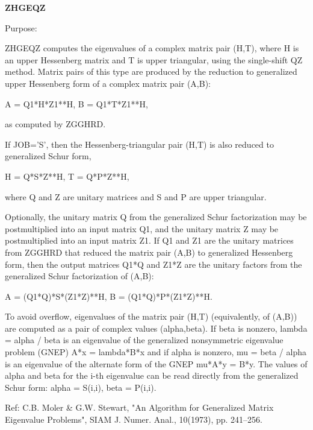 {\bfseries Z\+H\+G\+E\+Q\+Z} 

 \begin{DoxyParagraph}{Purpose\+: }
\begin{DoxyVerb} ZHGEQZ computes the eigenvalues of a complex matrix pair (H,T),
 where H is an upper Hessenberg matrix and T is upper triangular,
 using the single-shift QZ method.
 Matrix pairs of this type are produced by the reduction to
 generalized upper Hessenberg form of a complex matrix pair (A,B):
 
    A = Q1*H*Z1**H,  B = Q1*T*Z1**H,
 
 as computed by ZGGHRD.
 
 If JOB='S', then the Hessenberg-triangular pair (H,T) is
 also reduced to generalized Schur form,
 
    H = Q*S*Z**H,  T = Q*P*Z**H,
 
 where Q and Z are unitary matrices and S and P are upper triangular.
 
 Optionally, the unitary matrix Q from the generalized Schur
 factorization may be postmultiplied into an input matrix Q1, and the
 unitary matrix Z may be postmultiplied into an input matrix Z1.
 If Q1 and Z1 are the unitary matrices from ZGGHRD that reduced
 the matrix pair (A,B) to generalized Hessenberg form, then the output
 matrices Q1*Q and Z1*Z are the unitary factors from the generalized
 Schur factorization of (A,B):
 
    A = (Q1*Q)*S*(Z1*Z)**H,  B = (Q1*Q)*P*(Z1*Z)**H.
 
 To avoid overflow, eigenvalues of the matrix pair (H,T)
 (equivalently, of (A,B)) are computed as a pair of complex values
 (alpha,beta).  If beta is nonzero, lambda = alpha / beta is an
 eigenvalue of the generalized nonsymmetric eigenvalue problem (GNEP)
    A*x = lambda*B*x
 and if alpha is nonzero, mu = beta / alpha is an eigenvalue of the
 alternate form of the GNEP
    mu*A*y = B*y.
 The values of alpha and beta for the i-th eigenvalue can be read
 directly from the generalized Schur form:  alpha = S(i,i),
 beta = P(i,i).

 Ref: C.B. Moler & G.W. Stewart, "An Algorithm for Generalized Matrix
      Eigenvalue Problems", SIAM J. Numer. Anal., 10(1973),
      pp. 241--256.\end{DoxyVerb}
 
\end{DoxyParagraph}

